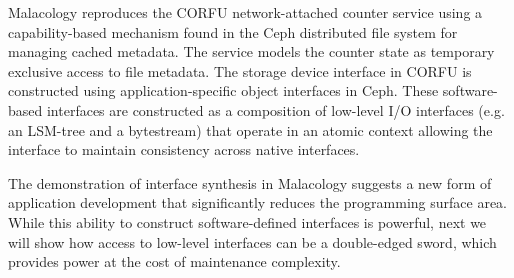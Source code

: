 Malacology reproduces the CORFU network-attached counter service using a
capability-based mechanism found in the Ceph distributed file system for
managing cached metadata. The service models the counter state as temporary
exclusive access to file metadata.  The storage device interface in CORFU is
constructed using application-specific object interfaces in Ceph. These
software-based interfaces are constructed as a composition of low-level I/O
interfaces (e.g. an LSM-tree and a bytestream) that operate in an atomic
context allowing the interface to maintain consistency across native
interfaces.

The demonstration of interface synthesis in Malacology suggests a new form of
application development that significantly reduces the programming surface
area. While this ability to construct software-defined interfaces is powerful,
next we will show how access to low-level interfaces can be a double-edged
sword, which provides power at the cost of maintenance complexity.
